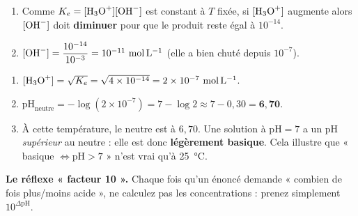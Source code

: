 \documentclass[11pt,a4paper]{article}
\begin{document}
\begin{corrbox}
\begin{enumerate}[label=\alph*),leftmargin=1.6em,itemsep=2pt]
  \item Comme $K_e=[\ce{H3O+}][\ce{OH-}]$ est constant à $T$ fixée, si $[\ce{H3O+}]$ augmente alors
        $[\ce{OH-}]$ doit \textbf{diminuer} pour que le produit reste égal à $10^{-14}$.
  \item $[\ce{OH-}] = \dfrac{10^{-14}}{10^{-3}} = 10^{-11}\ \si{mol.L^{-1}}$ (elle a bien chuté depuis
        $10^{-7}$).
\end{enumerate}
\end{corrbox}

\begin{corrbox}
\begin{enumerate}[label=\alph*),leftmargin=1.6em,itemsep=2pt]
  \item $[\ce{H3O+}] = \sqrt{K_e} = \sqrt{4\times10^{-14}} = 2\times10^{-7}\ \si{mol.L^{-1}}$.
  \item $\mathrm{pH}_{\text{neutre}} = -\log(2\times10^{-7}) = 7 - \log 2 \approx 7 - 0{,}30 = \mathbf{6{,}70}$.
  \item À cette température, le neutre est à $6{,}70$. Une solution à $\mathrm{pH}=7$ a un pH \emph{supérieur}
        au neutre : elle est donc \textbf{légèrement basique}. Cela illustre que « basique $\Leftrightarrow
        \mathrm{pH}>7$ » n'est vrai qu'à \SI{25}{\celsius}.
\end{enumerate}
\end{corrbox}

\begin{astuce}
\textbf{Le réflexe « facteur 10 ».} Chaque fois qu'un énoncé demande « combien de fois plus/moins acide »,
ne calculez pas les concentrations : prenez simplement $10^{\Delta\mathrm{pH}}$.
\end{astuce}
\end{document}
